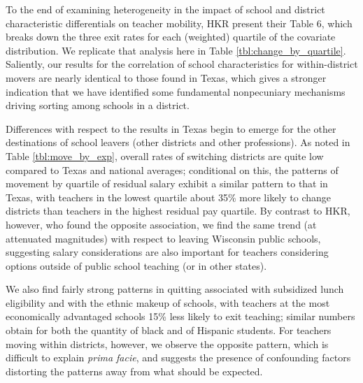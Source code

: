 \documentclass[]{article}
\begin{document}
To the end of examining heterogeneity in the impact of school and
district characteristic differentials on teacher mobility, HKR present
their Table 6, which breaks down the three exit rates for each
(weighted) quartile of the covariate distribution. We replicate that
analysis here in Table \ref{tbl:change_by_quartile}. Saliently, our
results for the correlation of school characteristics for
within-district movers are nearly identical to those found in Texas,
which gives a stronger indication that we have identified some
fundamental nonpecuniary mechanisms driving sorting among schools in a
district.

Differences with respect to the results in Texas begin to emerge for the
other destinations of school leavers (other districts and other
professions). As noted in Table \ref{tbl:move_by_exp}, overall rates of
switching districts are quite low compared to Texas and national
averages; conditional on this, the patterns of movement by quartile of
residual salary exhibit a similar pattern to that in Texas, with
teachers in the lowest quartile about 35\% more likely to change
districts than teachers in the highest residual pay quartile. By
contrast to HKR, however, who found the opposite association, we find
the same trend (at attenuated magnitudes) with respect to leaving
Wisconsin public schools, suggesting salary considerations are also
important for teachers considering options outside of public school
teaching (or in other states).

We also find fairly strong patterns in quitting associated with
subsidized lunch eligibility and with the ethnic makeup of schools, with
teachers at the most economically advantaged schools 15\% less likely to
exit teaching; similar numbers obtain for both the quantity of black and
of Hispanic students. For teachers moving within districts, however, we
observe the opposite pattern, which is difficult to explain \emph{prima
facie}, and suggests the presence of confounding factors distorting the
patterns away from what should be expected.
\end{document}
